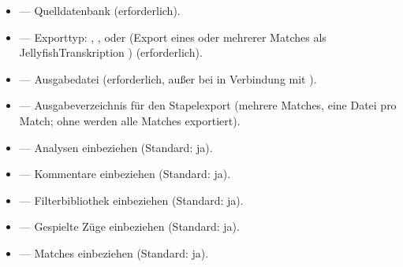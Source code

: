 \documentclass[letterpaper,10pt,german]{sphinxmanual}
\begin{document}
\begin{itemize}
\item {} 
\sphinxAtStartPar
{} — Quelldatenbank (erforderlich).

\item {} 
\sphinxAtStartPar
{} — Exporttyp: , ,  oder  (Export eines oder mehrerer Matches als Jellyfish\sphinxhyphen{}Transkription ) (erforderlich).

\item {} 
\sphinxAtStartPar
{} — Ausgabedatei (erforderlich, außer bei  in Verbindung mit ).

\item {} 
\sphinxAtStartPar
{} — Ausgabeverzeichnis für den \sphinxhyphen{}Stapelexport (mehrere Matches, eine Datei pro Match; ohne  werden alle Matches exportiert).

\item {} 
\sphinxAtStartPar
{} — Analysen einbeziehen (Standard: ja).

\item {} 
\sphinxAtStartPar
{} — Kommentare einbeziehen (Standard: ja).

\item {} 
\sphinxAtStartPar
{} — Filterbibliothek einbeziehen (Standard: ja).

\item {} 
\sphinxAtStartPar
{} — Gespielte Züge einbeziehen (Standard: ja).

\item {} 
\sphinxAtStartPar
{} — Matches einbeziehen (Standard: ja).


\end{itemize}
\end{document}
